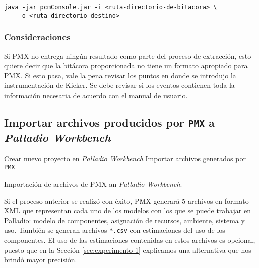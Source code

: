 \begin{verbatim}
java -jar pcmConsole.jar -i <ruta-directorio-de-bitacora> \
    -o <ruta-directorio-destino>
\end{verbatim}

\subsubsection{Consideraciones}
Si PMX no entrega ningún resultado como parte del proceso de extracción, esto quiere decir que la bitácora proporcionada no tiene un formato apropiado para PMX. Si esto pasa, vale la pena revisar los puntos en donde se introdujo la instrumentación de Kieker. Se debe revisar si los eventos contienen toda la información necesaria de acuerdo con el manual de usuario. 

\subsection{Importar archivos producidos por \texttt{PMX} a \emph{Palladio Workbench}}
\begin{singlespace}
\begin{algorithm}[H]
\SetAlgoLined
Crear nuevo proyecto en \emph{Palladio Workbench}\;
Importar archivos generados por \texttt{PMX}\;
\caption{Importación de archivos de PMX an \emph{Palladio Workbench}.}
\end{algorithm}
\end{singlespace}

Si el proceso anterior se realizó con éxito, PMX  generará 5 archivos en formato XML que representan cada uno de los modelos con los que se puede trabajar en Palladio: modelo de componentes, asignación de recursos, ambiente, sistema y uso. También se generan archivos \texttt{*.csv} con estimaciones del uso de los componentes. El uso de las estimaciones contenidas en estos archivos es opcional, puesto que en la Sección \ref{sec:experimento-1} explicamos una alternativa que nos brindó mayor precisión.

